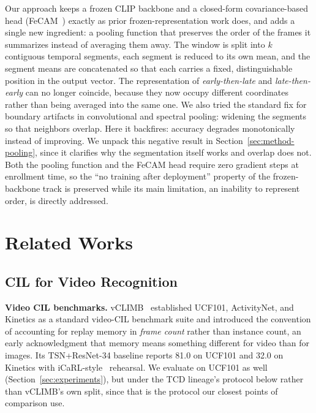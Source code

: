 \documentclass[a4paper,fleqn]{cas-dc}
\begin{document}
Our approach keeps a frozen CLIP backbone and a closed-form covariance-based
head (FeCAM~\cite{goswami2023fecam}) exactly as prior frozen-representation work does, and adds a
single new ingredient: a pooling function that preserves the order of the
frames it summarizes instead of averaging them away. The window is split
into $k$ contiguous temporal segments, each segment is reduced to its own
mean, and the segment means are concatenated so that each carries a fixed,
distinguishable position in the output vector. The representation of
\emph{early-then-late} and \emph{late-then-early} can no longer coincide,
because they now occupy different coordinates rather than being averaged
into the same one. We also tried the standard fix for boundary artifacts in convolutional and
spectral pooling: widening the segments so that neighbors overlap. Here it
backfires: accuracy degrades monotonically instead of improving. We unpack
this negative result in Section~\ref{sec:method-pooling}, since it
clarifies why the segmentation itself works and overlap does not. Both the
pooling function and the FeCAM head require zero gradient steps at
enrollment time, so the ``no training after deployment'' property of the
frozen-backbone track is preserved while its main limitation, an inability
to represent order, is directly addressed.


\section{Related Works}
\label{sec:related}

\subsection{CIL for Video Recognition}

\textbf{Video CIL benchmarks.} vCLIMB~\cite{villa2022vclimb} established UCF101,
ActivityNet, and Kinetics as a standard video-CIL benchmark suite and
introduced the convention of accounting for replay memory in \emph{frame
count} rather than instance count, an early acknowledgment that memory
means something different for video than for images. Its TSN+ResNet-34
baseline reports 81.0 on UCF101 and 32.0 on Kinetics with iCaRL-style~\cite{rebuffi2017icarl}
rehearsal. We evaluate on UCF101 as well (Section~\ref{sec:experiments}),
but under the TCD lineage's protocol below rather than vCLIMB's own split,
since that is the protocol our closest points of comparison use.
\end{document}
